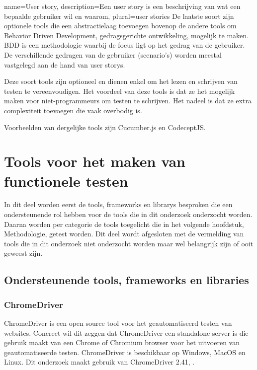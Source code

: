 {
    name=User story,
    description={Een user story is een beschrijving van wat een bepaalde gebruiker wil en waarom},
    plural={user stories}
}
De laatste soort zijn optionele \glspl{tool} die een abstractielaag toevoegen bovenop de andere \glspl{tool} om Behavior Driven Development, gedragsgerichte ontwikkeling, mogelijk te maken. \gls{BDD} is een methodologie waarbij de focus ligt op het gedrag van de gebruiker. De verschillende gedragen van de gebruiker (scenario's)  worden meestal vastgelegd aan de hand van \glspl{user story}.

Deze soort \glspl{tool} zijn optioneel en dienen enkel om het lezen en schrijven van testen te vereenvoudigen. Het voordeel van deze \glspl{tool} is dat ze het mogelijk maken voor niet-programmeurs om testen te schrijven. Het nadeel is dat ze extra complexiteit toevoegen die vaak overbodig is.

Voorbeelden van dergelijke \glspl{tool} zijn Cucumber.js en CodeceptJS.

\clearpage
\section{Tools voor het maken van functionele testen}
In dit deel worden eerst de \glspl{tool}, \glspl{framework} en \glspl{library} besproken die een ondersteunende rol hebben voor de \glspl{tool} die in dit onderzoek onderzocht worden. Daarna worden per categorie de \glspl{tool} toegelicht die in het volgende hoofdstuk, Methodologie, getest worden. Dit deel wordt afgesloten met de vermelding van \glspl{tool} die in dit onderzoek niet onderzocht worden maar wel belangrijk zijn of ooit geweest zijn.

\subsection{Ondersteunende tools, frameworks en libraries}

\subsubsection{ChromeDriver}
ChromeDriver is een open source \gls{tool} voor het geautomatiseerd testen van websites. Concreet wil dit zeggen dat ChromeDriver een standalone server is die gebruik maakt van een Chrome of Chromium browser voor het uitvoeren van geautomatiseerde testen. ChromeDriver is beschikbaar op Windows, MacOS en Linux. Dit onderzoek maakt gebruik van ChromeDriver 2.41, \textcite{ChromeDriver2018}.

